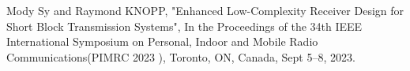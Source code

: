  Mody Sy and Raymond KNOPP, "Enhanced Low-Complexity Receiver Design for Short Block Transmission Systems", In the Proceedings of the 34th IEEE International Symposium on Personal, Indoor and Mobile Radio Communications(PIMRC 2023 ), Toronto, ON, Canada, Sept 5–8, 2023.